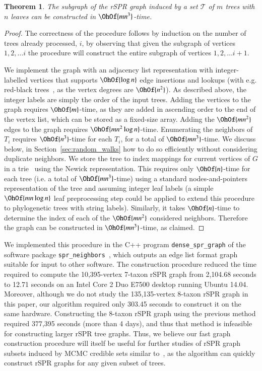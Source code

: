 \documentclass[]{elsarticle}
\newtheorem{thm}{Theorem}[section]
\begin{document}
\begin{thm}
	\label{thm:construct_graph}
	The subgraph of the rSPR graph induced by a set $\mathcal{T}$ of $m$ trees with $n$ leaves can be constructed in $\OhOf{mn^3}$-time.
\end{thm}
\begin{proof}
	The correctness of the procedure follows by induction on the number of trees already processed, $i$, by observing that given the subgraph of vertices $1, 2,  \ldots i$ the procedure will construct the entire subgraph of vertices $1, 2, \ldots i+1$.

	We implement the graph with an adjacency list representation with integer-labelled vertices that supports $\OhOf{\log n}$ edge insertions and lookups (with e.g. red-black trees~\citep{guibas1978dichromatic}, as the vertex degrees are $\OhOf{n^2}$).
	As described above, the integer labels are simply the order of the input trees.
	Adding the vertices to the graph requires $\OhOf{m}$-time, as they are added in ascending order to the end of the vertex list, which can be stored as a fixed-size array.
	Adding the $\OhOf{mn^2}$ edges to the graph requires $\OhOf{mn^2 \log n}$-time.
	Enumerating the neighbors of $T_i$ requires $\OhOf{n^3}$-time for each $T_i$, for a total of $\OhOf{mn^3}$-time.
	We discuss below, in Section~\ref{sec:random_walks} how to do so efficiently without considering duplicate neighbors.
	We store the tree to index mappings for current vertices of $G$ in a trie~\citep{fredkin1960trie} using the Newick representation.
	This requires only $\OhOf{n}$-time for each tree (i.e. a total of $\OhOf{mn^3}$-time) using a standard nodes-and-pointers representation of the tree and assuming integer leaf labels (a simple $\OhOf{mn\log n}$ leaf preprocessing step could be applied to extend this procedure to phylogenetic trees with string labels).
	Similarly, it takes $\OhOf{n}$-time to determine the index of each of the $\OhOf{mn^2}$ considered neighbors.
	Therefore the graph can be constructed in $\OhOf{mn^3}$-time, as claimed.
\end{proof}

We implemented this procedure in the C++ program \texttt{dense\_spr\_graph} of the software package \texttt{spr\_neighbors}~\citep{spr_neighbors}, which outputs an edge list format graph suitable for input to other software.
The construction procedure reduced the time required to compute the 10,395-vertex 7-taxon rSPR graph from 2,104.68 seconds to 12.71 seconds on an Intel Core 2 Duo E7500 desktop running Ubuntu 14.04.
Moreover, although we do not study the 135,135-vertex 8-taxon rSPR graph in this paper, our algorithm required only 303.45 seconds to construct it on the same hardware.
Constructing the 8-taxon rSPR graph using the previous method required 377,395 seconds (more than 4 days), and thus that method is infeasible for constructing larger rSPR tree graphs.
Thus, we believe our fast graph construction procedure will itself be useful for further studies of rSPR graph subsets induced by MCMC credible sets similar to~\citep{Whidden2015-yi}, as the algorithm can quickly construct rSPR graphs for any given subset of trees.
\end{document}

